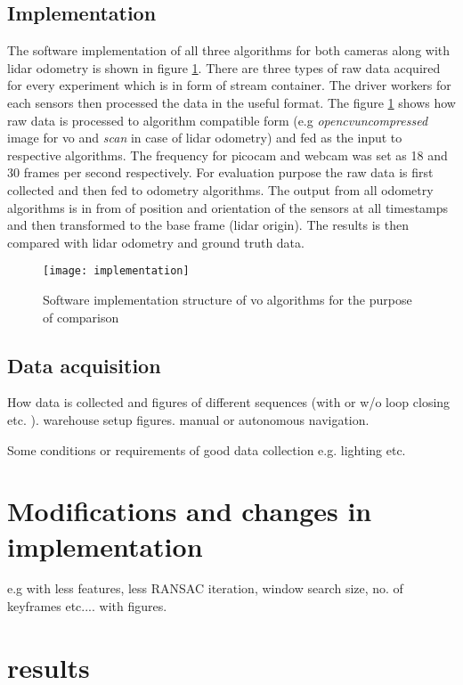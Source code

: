 \subsection{Implementation}
The software implementation of all three algorithms for both cameras along with \acrshort{lidar} odometry is shown in figure \ref{fig:implementation}. There are three types of raw data acquired for every experiment which is in form of stream container. The driver workers for each sensors then processed the data in the useful format. The figure \ref{fig:implementation} shows how raw data is processed to algorithm compatible form (e.g \textit{opencvuncompressed} image for \acrshort{vo} and \textit{scan} in case of \acrshort{lidar} odometry) and fed as the input to respective algorithms. The frequency for picocam and webcam was set as 18 and 30 frames per second respectively. For evaluation purpose the raw data is first collected and then fed to odometry algorithms. The output from all odometry algorithms is in from of position and orientation of the sensors at all timestamps and then transformed to the base frame (\acrshort{lidar} origin). The results is then compared with \acrshort{lidar} odometry and ground truth data.
\begin{figure}[h!]
	\centering
	\texttt{[image: implementation]}
	\caption{Software implementation structure of \acrshort{vo} algorithms for the purpose of comparison}
	\label{fig:implementation}
\end{figure}


\subsection{Data acquisition}

How data is collected and figures of different sequences (with or w/o loop closing etc. ). warehouse setup figures. 
manual or autonomous navigation.

Some conditions or requirements of good data collection e.g. lighting etc. 

\section{Modifications and changes in implementation}
e.g with less features, less RANSAC iteration, window search size, no. of keyframes etc....
with figures.


\section{results}
